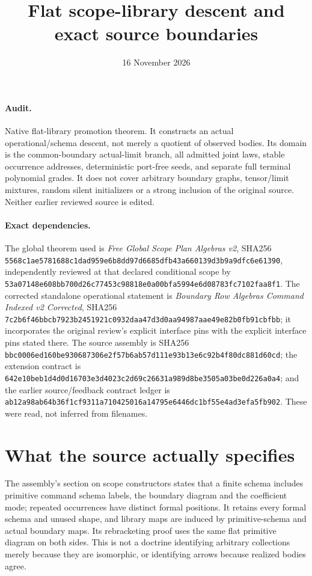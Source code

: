 \documentclass[11pt]{article}
\title{Flat scope-library descent and exact source boundaries}
\date{16 November 2026}
\begin{document}
\maketitle
\paragraph{Audit.} Native flat-library promotion theorem. It constructs an actual operational/schema descent, not merely a quotient of observed bodies. Its domain is the common-boundary actual-limit branch, all admitted joint laws, stable occurrence addresses, deterministic port-free seeds, and separate full terminal polynomial grades. It does not cover arbitrary boundary graphs, tensor/limit mixtures, random silent initializers or a strong inclusion of the original source. Neither earlier reviewed source is edited.

\paragraph{Exact dependencies.} The global theorem used is \emph{Free Global Scope Plan Algebras v2}, SHA256 \texttt{5568c1ae5781688c1dad959e6b8dd97d6685dfb43a660139d3b9a9dfc6e61390}, independently reviewed at that declared conditional scope by \texttt{53a07148e608bb700d26c77453c98818e0a00bfa5994e6d08783fc7102faa8f1}. The corrected standalone operational statement is \emph{Boundary Row Algebras Command Indexed v2 Corrected}, SHA256 \texttt{7c2b6f46bbcb7923b2451921c0932daa47d3d0aa94987aae49e82b0fb91cbfbb}; it incorporates the original review's explicit interface pins with the explicit interface pins stated there. The source assembly is SHA256 \texttt{bbc0006ed160be930687306e2f57b6ab57d111e93b13e6c92b4f80dc881d60cd}; the extension contract is \texttt{642e10beb1d4d0d16703e3d4023c2d69c26631a989d8be3505a03be0d226a0a4}; and the earlier source/feedback contract ledger is \texttt{ab12a98ab64b36f1cf9311a710425016a14795e6446dc1bf55e4ad3efa5fb902}. These were read, not inferred from filenames.

\section{What the source actually specifies}
The assembly's section on scope constructors states that a finite schema includes primitive command schema labels, the boundary diagram and the coefficient mode; repeated occurrences have distinct formal positions. It retains every formal schema and unused shape, and library maps are induced by primitive-schema and actual boundary maps. Its rebracketing proof uses the same flat primitive diagram on both sides. This is not a doctrine identifying arbitrary collections merely because they are isomorphic, or identifying arrows because realized bodies agree.
\end{document}

